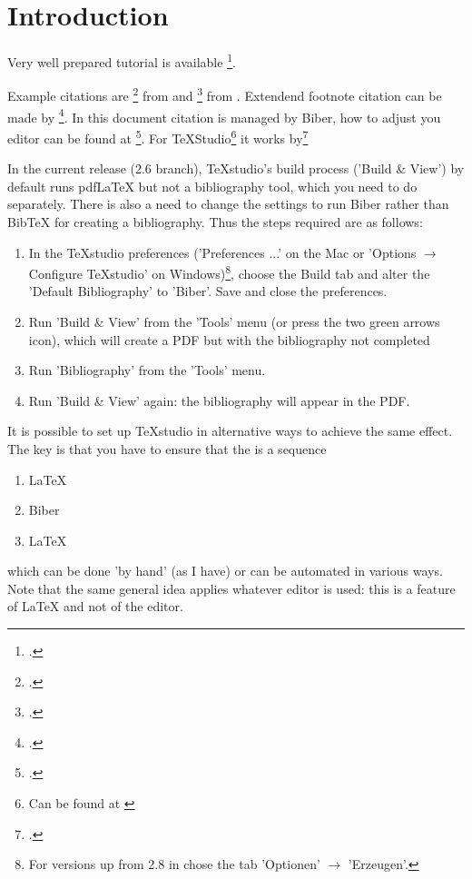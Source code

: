\documentclass{eegreport}
\begin{document}
\mytitlepage
{} 
\tableofcontents 
{} 


\section{Introduction}

Very well prepared tutorial is available \footcite{TUG.2015}. 

Example citations are \footcite{APG.11.2013} from \citeauthor{APG.11.2013} and \footcite{Joskow.2005} from \citeauthor{Joskow.2005}. Extendend footnote citation can be made by \footcite[For further information see at][page 17]{Joskow.2005}. In this document citation is managed by Biber, how to adjust you editor can be found at \footcite{texstackexchange.2015}. For \TeX Studio\footnote{Can be found at  \cite{Texstudio.2015}} it works by\footcite{texstackexchange.2015} 
\begin{myquote}
In the current release (2.6 branch), TeXstudio's build process ('Build \& View') by default runs pdfLaTeX but not a bibliography tool, which you need to do separately. There is also a need to change the settings to run Biber rather than BibTeX for creating a bibliography. Thus the steps required are as follows:
\begin{enumerate}
\item In the TeXstudio preferences ('Preferences ...' on the Mac or 'Options $ \rightarrow $ Configure TeXstudio' on Windows)\footnote{For versions up from 2.8 in chose the tab 'Optionen' $ \rightarrow $ 'Erzeugen'. }, choose the Build tab and alter the 'Default Bibliography' to 'Biber'. Save and close the preferences.
\item Run 'Build \& View' from the 'Tools' menu (or press the two green arrows icon), which will create a PDF but with the bibliography not completed
\item Run 'Bibliography' from the 'Tools' menu.
\item Run 'Build \& View' again: the bibliography will appear in the PDF.
\end{enumerate}
It is possible to set up TeXstudio in alternative ways to achieve the same effect. The key is that you have to ensure that the is a sequence
\begin{enumerate}
\item \LaTeX
\item Biber
\item \LaTeX
\end{enumerate}
which can be done 'by hand' (as I have) or can be automated in various ways. Note that the same general idea applies whatever editor is used: this is a feature of LaTeX and not of the editor.
\end{myquote}
\end{document}
